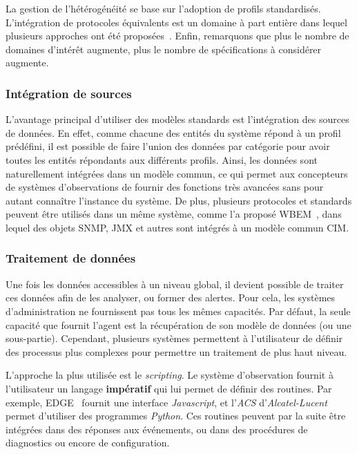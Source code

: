 La gestion de l'hétérogénéité se base sur l'adoption de profils standardisés. L'intégration de protocoles équivalents est un domaine à part entière dans lequel plusieurs approches ont été proposées~\cite{Kaed:these}. Enfin, remarquons que plus le nombre de domaines d'intérêt augmente, plus le nombre de spécifications à considérer augmente.

\subsubsection{Intégration de sources}
L'avantage principal d'utiliser des modèles standards est l'intégration des sources de données. En effet, comme chacune des entités du système répond à un profil prédéfini, il est possible de faire l'union des données par catégorie pour avoir toutes les entités répondants aux différents profils. Ainsi, les données sont naturellement intégrées dans un modèle commun, ce qui permet aux concepteurs de systèmes d'observations de fournir des fonctions très avancées sans pour autant connaître l'instance du système. De plus, plusieurs protocoles et standards peuvent être utilisés dans un même système, comme l'a proposé WBEM~\cite{DMTF:WBEM}, dans lequel des objets SNMP, JMX et autres sont intégrés à un modèle commun CIM.

\subsubsection{Traitement de données}
Une fois les données accessibles à un niveau global, il devient possible de traiter ces données afin de les analyser, ou former des alertes. Pour cela, les systèmes d'administration ne fournissent pas tous les mêmes capacités. Par défaut, la seule capacité que fournit l'agent est la récupération de son modèle de données (ou une sous-partie). Cependant, plusieurs systèmes permettent à l'utilisateur de définir des processus plus complexes pour permettre un traitement de plus haut niveau.

L'approche la plus utilisée est le \textit{scripting}. Le système d'observation fournit à l'utilisateur un langage \textbf{impératif} qui lui permet de définir des routines. Par exemple, EDGE~\cite{Motorola:EDGE} fournit une interface \textit{Javascript}, et l'\textit{ACS} d'\textit{Alcatel-Lucent} permet d'utiliser des programmes \textit{Python}. Ces routines peuvent par la suite être intégrées dans des réponses aux événements, ou dans des procédures de diagnostics ou encore de configuration.

